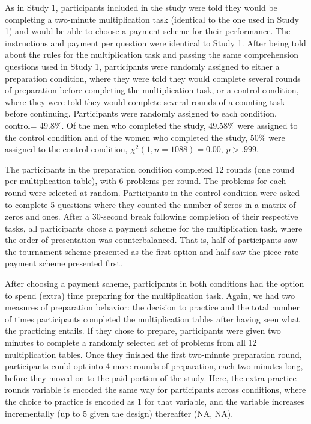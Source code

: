 \documentclass[a4paper,nobind]{templates/ociamthesis}
\begin{document}
As in Study 1, participants included in the study were told they would be completing a two-minute multiplication task (identical to the one used in Study 1) and would be able to choose a payment scheme for their performance. The instructions and payment per question were identical to Study 1. After being told about the rules for the multiplication task and passing the same comprehension questions used in Study 1, participants were randomly assigned to either a preparation condition, where they were told they would complete several rounds of preparation before completing the multiplication task, or a control condition, where they were told they would complete several rounds of a counting task before continuing. Participants were randomly assigned to each condition, control= 49.8\%. Of the men who completed the study, 49.58\% were assigned to the control condition and of the women who completed the study, 50\% were assigned to the control condition, \(\chi^2(1, n = 1088) = 0.00\), \(p > .999\).

The participants in the preparation condition completed 12 rounds (one round per multiplication table), with 6 problems per round. The problems for each round were selected at random. Participants in the control condition were asked to complete 5 questions where they counted the number of zeros in a matrix of zeros and ones. After a 30-second break following completion of their respective tasks, all participants chose a payment scheme for the multiplication task, where the order of presentation was counterbalanced. That is, half of participants saw the tournament scheme presented as the first option and half saw the piece-rate payment scheme presented first.

After choosing a payment scheme, participants in both conditions had the option to spend (extra) time preparing for the multiplication task. Again, we had two measures of preparation behavior: the decision to practice and the total number of times participants completed the multiplication tables after having seen what the practicing entails. If they chose to prepare, participants were given two minutes to complete a randomly selected set of problems from all 12 multiplication tables. Once they finished the first two-minute preparation round, participants could opt into 4 more rounds of preparation, each two minutes long, before they moved on to the paid portion of the study. Here, the extra practice rounds variable is encoded the same way for participants across conditions, where the choice to practice is encoded as 1 for that variable, and the variable increases incrementally (up to 5 given the design) thereafter (NA, NA).
\end{document}
